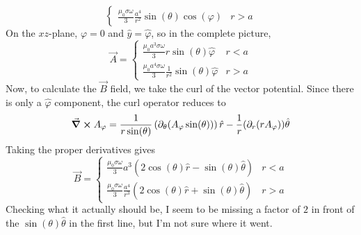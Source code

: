\documentclass[a4paper,twoside]{article}
\begin{document}
\begin{problem}
\begin{equation}
\begin{cases}
            \frac{\mu_0 \sigma \omega}{3} \frac{a^4}{r^2} \sin(\theta) \cos(\varphi) & r > a
        \end{cases}
    \end{equation}
    On the $ xz $-plane, $ \varphi = 0 $ and $ \hat{y} = \hat{\varphi} $, so in the complete picture,
    \begin{equation}
        \vec{A} =
        \begin{cases}
            \frac{\mu_0 a^3 \sigma \omega}{3} r \sin(\theta) \hat{\varphi} & r<a\\
            \frac{\mu_0 a^4 \sigma \omega}{3} \frac{1}{r^2} \sin(\theta) \hat{\varphi} & r>a
        \end{cases}
    \end{equation}
    Now, to calculate the $ \vec{B} $ field, we take the curl of the vector potential. Since there is only a $ \hat{\varphi} $ component, the curl operator reduces to
    \begin{equation}
        \curl{A_{\varphi}} = \frac{1}{r \sin(\theta)} \left( \partial_{\theta}(A_{\varphi} \sin(\theta)) \right) \hat{r} - \frac{1}{r} (\partial_r (r A_{\varphi})) \hat{\theta}
    \end{equation}
    Taking the proper derivatives gives
    \begin{equation}
        \vec{B} =
        \begin{cases}
            \frac{\mu_0 \sigma \omega}{3} a^3 (2 \cos(\theta) \hat{r} - \sin(\theta) \hat{\theta}) & r<a\\
            \frac{\mu_0 \sigma \omega}{3} \frac{a^4}{r^3} (2 \cos(\theta) \hat{r} + \sin(\theta) \hat{\theta}) & r>a
        \end{cases}
    \end{equation}
    Checking what it actually should be, I seem to be missing a factor of $ 2 $ in front of the $ \sin(\theta) \hat{\theta} $ in the first line, but I'm not sure where it went.
\end{problem}
\end{document}
